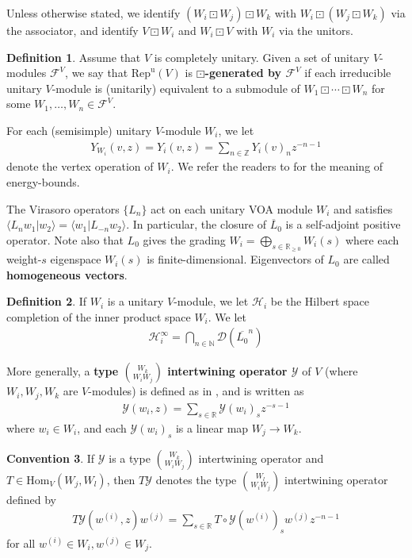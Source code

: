 \documentclass[11pt,b5paper,notitlepage]{article}
\theoremstyle{definition}
\newtheorem{df}{Definition}[section]
\newtheorem{cv}[df]{Convention}
\theoremstyle{plain}
\newcommand{\mc}{\mathcal}
\newcommand{\ovl}{\overline}
\newcommand{\Hom}{\mathrm{Hom}}
\newcommand{\Dom}{\scr D}
\newcommand{\uni}{\mathrm{u}}
\newcommand{\bk}[1]{\langle {#1}\rangle}
\newcommand{\scr}{\mathscr}
\newcommand{\RepV}{{\mathrm{Rep}^\uni(V)}}
\newcommand{\Nbb}{\mathbb N}
\newcommand{\Zbb}{\mathbb Z}
\newcommand{\Rbb}{\mathbb R}
\numberwithin{equation}{section}
\begin{document}
Unless otherwise stated, we identify $(W_i\boxdot W_j)\boxdot W_k$ with $W_i\boxdot (W_j\boxdot W_k)$ via the associator, and identify $V\boxdot W_i$ and $W_i\boxdot V$ with $W_i$ via the unitors.


\begin{df}
Assume that $V$ is completely unitary. Given a set of unitary $V$-modules $\mc F^V$, we say that $\RepV$ is \textbf{$\boxdot$-generated by $\mc F^V$} if each irreducible unitary $V$-module is (unitarily) equivalent to a submodule of $W_1\boxdot\cdots\boxdot W_n$ for some $W_1,\dots,W_n\in\mc F^V$.
\end{df}



For each (semisimple) unitary $V$-module $W_i$, we let
\begin{align*}
Y_{W_i}(v,z)=Y_i(v,z)=\sum_{n\in\Zbb} Y_i(v)_nz^{-n-1}
\end{align*}
denote the vertex operation of $W_i$. We refer the readers to \cite{CKLW18} for the meaning of energy-bounds. 

The Virasoro operators $\{L_n\}$ act on each unitary VOA module $W_i$ and satisfies $\bk{L_nw_1|w_2}=\bk{w_1|L_{-n} w_2}$. In particular, the closure of ${\ovl L_0}$ is a self-adjoint positive operator. Note also that $L_0$ gives the grading $W_i=\bigoplus_{s\in\Rbb_{\geq0}}W_i(s)$ where each weight-$s$ eigenspace $W_i(s)$ is finite-dimensional. Eigenvectors of $L_0$ are called \textbf{homogeneous vectors}.


\begin{df}\label{lb53}
If $W_i$ is a unitary $V$-module, we let $\mc H_i$ be the Hilbert space completion of the inner product space $W_i$. We let
\begin{align}
\mc H_i^\infty=\bigcap_{n\in\Nbb}\Dom(\ovl{L_0}^n)
\end{align}
\end{df}



More generally, a \textbf{type $W_k\choose W_iW_j$ intertwining operator $\mc Y$} of $V$ (where $W_i,W_j,W_k$ are $V$-modules) is defined as in \cite{FHL93}, and is written as
\begin{align*}
\mc Y(w_i,z)=\sum_{s\in\Rbb}\mc Y(w_i)_s z^{-s-1}
\end{align*}
where $w_i\in W_i$, and each $\mc Y(w_i)_s$ is a linear map $W_j\rightarrow W_k$. 

\begin{cv}
If $\mc Y$ is a type $W_k\choose W_iW_j$ intertwining operator and $T\in\Hom_V(W_j,W_l)$, then $T\mc Y$ denotes the type $W_l\choose W_iW_j$ intertwining operator defined by
\begin{align*}
T\mc Y(w^{(i)},z)w^{(j)}=\sum_{s\in\Rbb}T\circ \mc Y(w^{(i)})_s w^{(j)}z^{-n-1}
\end{align*}
for all $w^{(i)}\in W_i,w^{(j)}\in W_j$.
\end{cv}
\end{document}
